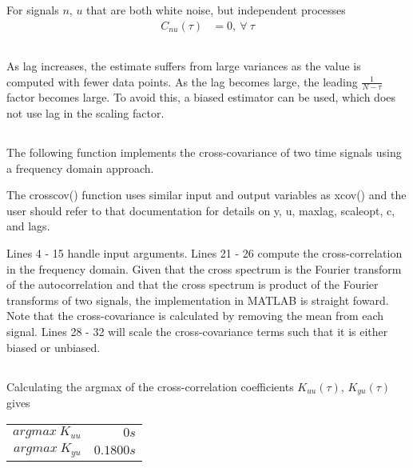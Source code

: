 \documentclass[times,12pt,reqno]{amsart}
\begin{document}
For signals $n$, $u$ that are both white noise, but independent processes
\begin{align*}
    C_{nu}(\tau) &= 0, \: \forall \: \tau
\end{align*}

\subsection{}
As lag increases, the estimate suffers from large variances as the value
is computed with fewer data points. As the lag becomes large, the leading
$\frac{1}{N - \tau}$ factor becomes large. To avoid this, a biased estimator
can be used, which does not use lag in the scaling factor.

\newpage
\subsection{}

The following function implements the cross-covariance of two time signals
using a frequency domain approach.

\lstset{caption=Cross-Covariance Function}


The crosscov() function uses similar input and output variables as xcov() and
the user should refer to that documentation for details on y, u, maxlag,
scaleopt, c, and lags.

Lines 4 - 15 handle input arguments. Lines 21 - 26 compute the
cross-correlation in the frequency domain. Given that the cross spectrum is the
Fourier transform of the autocorrelation and that the cross spectrum is product
of the Fourier transforms of two signals, the implementation in MATLAB is
straight foward. Note that the cross-covariance is calculated by removing the
mean from each signal. Lines 28 - 32 will scale the cross-covariance terms such
that it is either biased or unbiased.

\subsection{}
Calculating the argmax of the cross-correlation coefficients $K_{uu}(\tau)$,
$K_{yu}(\tau)$ gives

\begin{center}
    \begin{tabular} {|r|r|}
        \hline
        $argmax \: K_{uu}$ & $0 s$ \\
        $argmax \: K_{yu}$ & $0.1800 s$ \\
        \hline
    \end{tabular}
\end{center}
\end{document}
